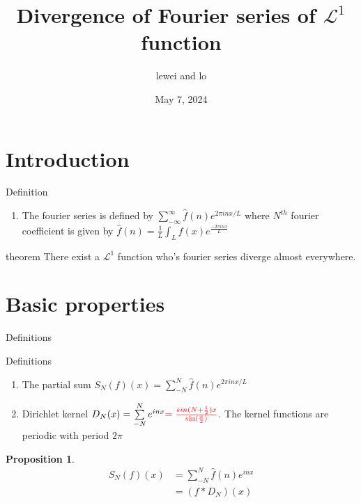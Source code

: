 \documentclass{beamer}
\author{lewei and lo}
\title{Divergence of Fourier series of $ \mathcal{L}^1  $ function}
\institute{UPEC}
\date{May 7, 2024}
\newtheorem{proposition}{Proposition}
\begin{document}
\kaishu
\begin{frame}
    \titlepage
    
\end{frame}

\begin{frame}
    \tableofcontents[sectionstyle=show,subsectionstyle=show/shaded/hide,subsubsectionstyle=show/shaded/hide]
\end{frame}


\section{Introduction}
\begin{frame}
    \begin{block}{Definition} 
        \begin{enumerate}
            \item  The fourier series is defined by $ \sum\limits_{-\infty}^{\infty} \hat{f}(n)e^{2\pi inx/L}$ where  $ N^{th} $ fourier coefficient is given by $ \hat{f}(n) =  \frac{1}{L} \int_{L}f(x)e^{\frac{-2\pi inx}{L}}$
        \end{enumerate}
    \end{block}
    \begin{block}{theorem}
        There exist a $ \mathcal{L} ^1 $ function who's fourier series diverge almost everywhere. 
    \end{block}
\end{frame}


\section{Basic properties}
\begin{frame}{Definitions }
\begin{block}{Definitions} 
    \begin{enumerate}
       
        \item  The partial sum $ S_N(f)(x)=\sum\limits_{-N}^{N}\hat{f}(n)e^{2\pi inx/L} $
        \item Dirichlet kernel $ D_N(x)=\sum\limits_{-N}^{N}e^{inx} \textcolor{red}{= \frac{sin(N+\frac{1}{2})x}{\sin(\frac{x}{2})}}$.  The kernel functions are periodic with period $ 2\pi $
        
    \end{enumerate}
\end{block}

   \begin{proposition}
    \begin{align*}
        S_N(f)(x)&=\sum\limits_{-N}^{N}\hat{f}(n)e^{inx}\\
        &=(f*D_N)(x)
       \end{align*}
   \end{proposition}
\end{frame}
\end{document}
